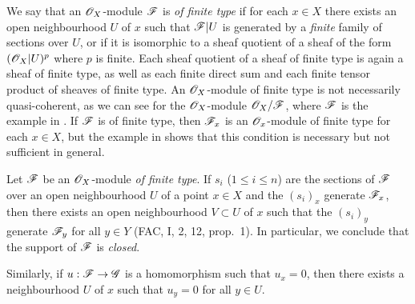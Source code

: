 \begin{env}[5.2.1]
\label{0.5.2.1}
We say that an $\mathscr{O}_X$-module $\mathscr{F}$ is \emph{of finite type} if for each $x\in X$ there exists an open neighbourhood $U$ of $x$ such that $\mathscr{F}|U$ is generated by a \emph{finite} family of sections over $U$, or if it is isomorphic to a sheaf quotient of a sheaf of the form $(\mathscr{O}_X|U)^p$ where $p$ is finite.
Each sheaf quotient of a sheaf of finite type is again a sheaf of finite type, as well as each finite direct sum and each finite tensor product of sheaves of finite type.
An $\mathscr{O}_X$-module of finite type is not necessarily quasi-coherent, as we can see for the $\mathscr{O}_X$-module $\mathscr{O}_X/\mathscr{F}$, where $\mathscr{F}$ is the example in .
If $\mathscr{F}$ is of finite type, then $\mathscr{F}_x$ is an $\mathscr{O}_x$-module of finite type for each $x\in X$, but the example in  shows that this condition is necessary but not sufficient in general.
\end{env}

\begin{env}[5.2.2]
\label{0.5.2.2}
Let $\mathscr{F}$ be an $\mathscr{O}_X$-module \emph{of finite type}.
If $s_i$ ($1\leq i\leq n$) are the sections of $\mathscr{F}$ over an open neighbourhood $U$ of a point $x\in X$ and the $(s_i)_x$ generate $\mathscr{F}_x$, then there exists an open neighbourhood $V\subset U$ of $x$ such that the $(s_i)_y$ generate $\mathscr{F}_y$ for all $y\in Y$ (FAC, I, 2, 12, prop.~1).
In particular, we conclude that the support of $\mathscr{F}$ is \emph{closed}.

Similarly, if $u:\sh{F}\to\sh{G}$ is a homomorphism such that $u_x=0$, then there exists a neighbourhood $U$ of $x$ such that $u_y=0$ for all $y\in U$.
\end{env}

